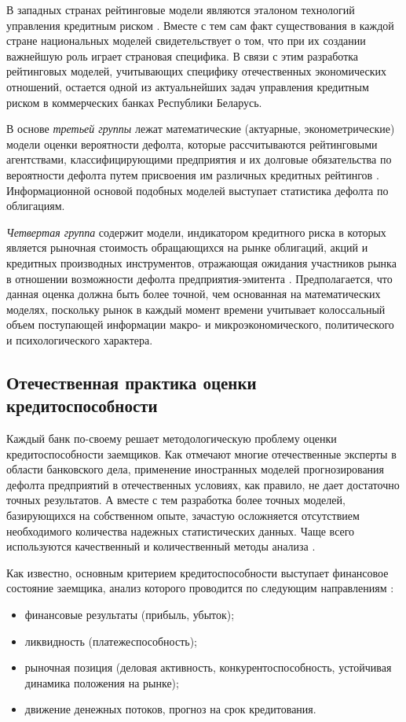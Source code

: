 \documentclass[14pt,a4paper]{extarticle}
\begin{document}
В западных странах рейтинговые модели являются эталоном технологий управления кредитным риском \cite{karminski2009}. 
Вместе с тем сам факт существования в каждой стране национальных моделей свидетельствует о том, что 
при их создании важнейшую роль играет страновая специфика. В связи с этим разработка рейтинговых моделей, 
учитывающих специфику отечественных экономических отношений, остается одной из актуальнейших задач 
управления кредитным риском в коммерческих банках Республики Беларусь.

В основе \textit{третьей группы} лежат математические (актуарные, эконометрические) модели оценки 
вероятности дефолта, которые рассчитываются рейтинговыми агентствами, классифицирующими предприятия и 
их долговые обязательства по вероятности дефолта путем присвоения им различных кредитных рейтингов 
\cite{credirriskmanagment2003}. 
Информационной основой подобных моделей выступает статистика дефолта по облигациям.

\textit{Четвертая группа} содержит модели, индикатором кредитного риска в которых является рыночная 
стоимость обращающихся на рынке облигаций, акций и кредитных производных инструментов, отражающая 
ожидания участников рынка в отношении возможности дефолта предприятия-эмитента \cite{crosbie2003}. Предполагается, 
что данная оценка должна быть более точной, чем основанная на математических моделях, поскольку рынок 
в каждый момент времени учитывает колоссальный объем поступающей информации макро- и микроэкономического, 
политического и психологического характера.

\subsection{Отечественная практика оценки кредитоспособности}

Каждый банк по-своему решает методологическую проблему оценки кредитоспособности заемщиков. Как отмечают 
многие отечественные эксперты в области банковского дела, применение иностранных моделей прогнозирования 
дефолта предприятий в отечественных условиях, как правило, не дает достаточно точных результатов. А 
вместе с тем разработка более точных моделей, базирующихся на собственном опыте, зачастую осложняется 
отсутствием необходимого количества надежных статистических данных. Чаще всего используются качественный 
и количественный методы анализа \cite{malugin2013}.

Как известно, основным критерием кредитоспособности выступает финансовое состояние заемщика, анализ 
которого проводится по следующим направлениям \cite{savitskaya2008}:
\begin{itemize}
    \item финансовые результаты (прибыль, убыток);
    \item ликвидность (платежеспособность);
    \item рыночная позиция (деловая активность, конкурентоспособность, устойчивая динамика положения на 
    рынке);
    \item движение денежных потоков, прогноз на срок кредитования.
\end{itemize}
\end{document}
